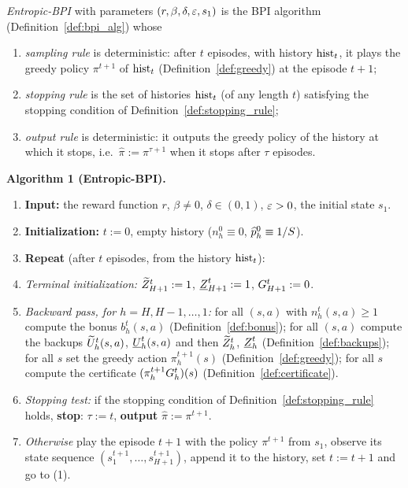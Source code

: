 \begin{definition}\label{def:entropic_bpi}
\leanok
{}
\emph{Entropic-BPI} with parameters $(r, \beta, \delta, \varepsilon, s_1)$ is the BPI algorithm
(Definition~\ref{def:bpi_alg}) whose
\begin{enumerate}
  \item[(i)] \emph{sampling rule} is deterministic: after $t$ episodes, with history $\mathrm{hist}_t$, it
        plays the greedy policy $\pi^{t+1}$ of $\mathrm{hist}_t$ (Definition~\ref{def:greedy}) at the
        episode $t + 1$;
  \item[(ii)] \emph{stopping rule} is the set of histories $\mathrm{hist}_t$ (of any length $t$) satisfying
        the stopping condition of Definition~\ref{def:stopping_rule};
  \item[(iii)] \emph{output rule} is deterministic: it outputs the greedy policy of the history at
        which it stops, i.e.\ $\hat\pi := \pi^{\tau + 1}$ when it stops after $\tau$ episodes.
\end{enumerate}

\medskip\noindent\textbf{Algorithm 1 (Entropic-BPI).}
\begin{enumerate}
  \item[] \textbf{Input:} the reward function $r$, $\beta \ne 0$, $\delta \in (0, 1)$, $\varepsilon > 0$, the
        initial state $s_1$.
  \item[] \textbf{Initialization:} $t := 0$, empty history ($n_h^0 \equiv 0$, $\widehat{p}_h^0 \equiv 1/S$).
  \item[] \textbf{Repeat} (after $t$ episodes, from the history $\mathrm{hist}_t$):
  \item[(1)] \emph{Terminal initialization:} $\widetilde{Z}^t_{H+1} := 1$, $\underline{Z}^t_{H+1} := 1$, $G^t_{H+1} := 0$.
  \item[(2)] \emph{Backward pass, for $h = H, H - 1, \dots, 1$:} for all $(s, a)$ with $n_h^t(s, a) \ge 1$
        compute the bonus $b_h^t(s, a)$ (Definition~\ref{def:bonus}); for all $(s, a)$ compute the
        backups $\widetilde{U}^t_h(s, a)$, $\underline{U}^t_h(s, a)$ and then $\widetilde{Z}^t_h$, $\underline{Z}^t_h$
        (Definition~\ref{def:backups}); for all $s$ set the greedy action $\pi^{t+1}_h(s)$
        (Definition~\ref{def:greedy}); for all $s$ compute the certificate $(\pi^{t+1}_hG^t_h)(s)$
        (Definition~\ref{def:certificate}).
  \item[(3)] \emph{Stopping test:} if the stopping condition of Definition~\ref{def:stopping_rule}
        holds, \textbf{stop}: $\tau := t$, \textbf{output} $\hat\pi := \pi^{t+1}$.
  \item[(4)] \emph{Otherwise} play the episode $t + 1$ with the policy $\pi^{t+1}$ from $s_1$,
        observe its state sequence $(s^{t+1}_1, \dots, s^{t+1}_{H+1})$, append it to the history,
        set $t := t + 1$ and go to (1).
\end{enumerate}
\end{definition}

